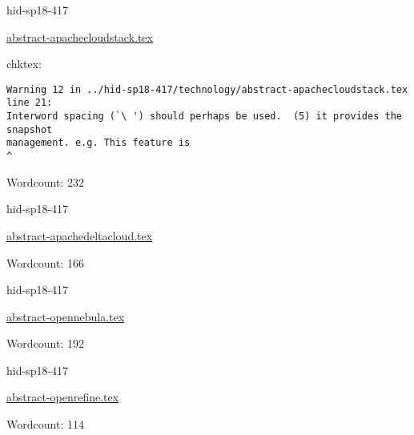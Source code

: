 

\begin{IU}

hid-sp18-417

\href{https://github.com/cloudmesh-community/hid-sp18-417/blob/master//technology/abstract-apachecloudstack.tex}{abstract-apachecloudstack.tex}

 
chktex:
\begin{tiny}
\begin{verbatim}
Warning 12 in ../hid-sp18-417/technology/abstract-apachecloudstack.tex line 21:
Interword spacing (`\ ') should perhaps be used.  (5) it provides the snapshot
management. e.g. This feature is                                             ^
\end{verbatim}
\end{tiny}

Wordcount: 232

\end{IU}



\begin{IU}

hid-sp18-417

\href{https://github.com/cloudmesh-community/hid-sp18-417/blob/master//technology/abstract-apachedeltacloud.tex}{abstract-apachedeltacloud.tex}

 

Wordcount: 166

\end{IU}



\begin{IU}

hid-sp18-417

\href{https://github.com/cloudmesh-community/hid-sp18-417/blob/master//technology/abstract-opennebula.tex}{abstract-opennebula.tex}

 

Wordcount: 192

\end{IU}



\begin{IU}

hid-sp18-417

\href{https://github.com/cloudmesh-community/hid-sp18-417/blob/master//technology/abstract-openrefine.tex}{abstract-openrefine.tex}

 

Wordcount: 114

\end{IU}

